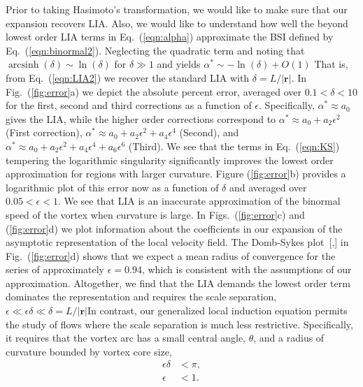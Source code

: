 \documentclass[aps,graphicx,reprint,onecolumn,12pt,tightenlines,longbibliography]{revtex4-1}
\DeclareMathOperator{\arcsinh}{arcsinh}
\newcommand{\sas}[2]{{#2}}
\begin{document}
\sas{}{Prior to taking Hasimoto's transformation, we would like to make sure that our expansion recovers LIA. Also, we would like to understand how well the beyond lowest order LIA terms in Eq.~(\ref{eqn:alpha}) approximate the BSI defined by Eq.~(\ref{eqn:binormal2}).} Neglecting the quadratic term and noting that $\arcsinh(\delta) \sim \ln(\delta)$ \sas{as $\delta{\to} \infty$}{for $\delta{\gg} 1$} and  yields $\alpha^{*} \sim -\ln(\delta) + O(1)$\sas{,}{} \sas{i.e.~}{That is, from Eq.~(\ref{eqn:LIA2}) we  recover} the standard LIA with $\delta = L/|\textbf{r}|$. In Fig.~(\ref{fig:error}a) we depict the absolute percent error, averaged over $0.1<\delta<10$ for the first, second and third corrections as a function of $\epsilon$. \sas{}{Specifically, $\alpha^{*} \approx a_{0}$ gives the LIA, while the higher order corrections correspond to  $\alpha^{*} \approx a_{0} + a_{2} \epsilon^{2}$ (First correction), $\alpha^{*} \approx a_{0} + a_{2} \epsilon^{2}+a_{4} \epsilon^{4}$ (Second), and $\alpha^{*} \approx a_{0} + a_{2} \epsilon^{2}+a_{4} \epsilon^{4}+a_{6} \epsilon^{6}$ (Third).}  We see that the terms in Eq.~(\ref{eqn:KS}) tempering the logarithmic singularity significantly improves the lowest order approximation   for regions with larger curvature. Figure (\ref{fig:error}b) provides a logarithmic plot of this error now as a function of $\delta$ and averaged over $0.05<\epsilon<1$. We see that LIA is  an inaccurate approximation of the binormal speed of the vortex when curvature is large. In Figs.~(\ref{fig:error}c) and (\ref{fig:error}d) we plot information about the coefficients in our expansion of the asymptotic representation of the local velocity field. The Domb-Sykes plot~[,] in Fig.~(\ref{fig:error}d) shows that we expect a mean radius of convergence for the series of approximately $\epsilon=0.94$, which is consistent with the assumptions of our approximation. Altogether, we find that the LIA demands the lowest order term dominates the representation and requires the scale separation,  $\epsilon \ll \epsilon\delta \ll \delta=L/|\bm{r}|$\sas{,}{In contrast,} our generalized local induction equation permits the study of flows where the scale separation is much less restrictive. \sas{Specifically, it requires {the} vortex arcs {have} a small enough central angle, $\theta$, such that $\epsilon < \epsilon \delta < \pi$ where $\epsilon < 1$.}{Specifically, it requires that the vortex arc has a small central angle, $\theta$, and a radius of curvature bounded by vortex core size,}
%
\begin{align}
 \epsilon \delta &< \pi, \\ \epsilon &< 1.
\end{align}
%
\end{document}
